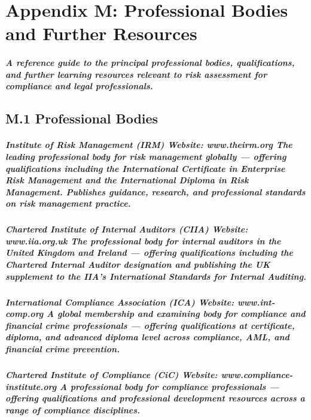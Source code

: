 \chapter*{Appendix M: Professional Bodies and Further Resources}
\label{chap:Appendix M: Professional Bodies and Further Resources}

\paragraph{A reference guide to the principal professional bodies, qualifications, and further learning resources relevant to risk assessment for compliance and legal professionals.}

\section*{M.1 Professional Bodies}
\paragraph{\textbf{Institute of Risk Management (IRM) Website}: \textit{www.theirm.org} The leading professional body for risk management globally — offering qualifications including the International Certificate in Enterprise Risk Management and the International Diploma in Risk Management. Publishes guidance, research, and professional standards on risk management practice.}
\paragraph{\textbf{Chartered Institute of Internal Auditors (CIIA)} Website: \textit{www.iia.org.uk} The professional body for internal auditors in the United Kingdom and Ireland — offering qualifications including the Chartered Internal Auditor designation and publishing the UK supplement to the IIA's International Standards for Internal Auditing.}
\paragraph{\textbf{International Compliance Association (ICA)} Website: \textit{www.int-comp.org} A global membership and examining body for compliance and financial crime professionals — offering qualifications at certificate, diploma, and advanced diploma level across compliance, AML, and financial crime prevention.}
\paragraph{\textbf{Chartered Institute of Compliance (CiC)} Website: \textit{www.compliance-institute.org} A professional body for compliance professionals — offering qualifications and professional development resources across a range of compliance disciplines.}
